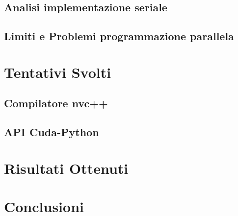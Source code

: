 \documentclass[12pt,a4paper]{report}
\begin{document}
\section{Analisi implementazione seriale}

\section{Limiti e Problemi programmazione parallela}

\chapter{Tentativi Svolti}
\section{Compilatore nvc++} %
\section{API Cuda-Python} %


\chapter{Risultati Ottenuti}

\chapter{Conclusioni}
\end{document}
